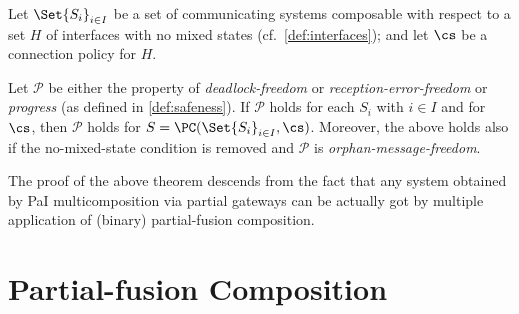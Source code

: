\begin{theorem}
\label{th:paisafenesse}
 Let $\Set{S_i}_{i\in I}$ be a set of communicating systems composable with respect to a set
 $H$ %
 of interfaces with no mixed states (cf.~\cref{def:interfaces}); and
let $\cs$ be a connection policy for $H$. 


Let $\mathcal{P}$ be
either the property of {\em deadlock-freedom} or {\em reception-error-freedom} 
or {\em progress}
(as defined in \cref{def:safeness}).
If $\mathcal{P}$ holds for each $S_i$ with $i \in I$ 
and for $\cs$, 
then $\mathcal{P}$ holds for $S  = \PC(\Set{S_i}_{i\in I}, \cs)$.
Moreover, the above holds also if the no-mixed-state condition is removed and
$\mathcal{P}$ is {\em orphan-message-freedom}.
\end{theorem}

The proof of the above theorem descends from the fact that any system obtained by 
PaI multicomposition via partial gateways can be actually got by multiple application of
(binary) partial-fusion composition. 


\section{Partial-fusion Composition}



